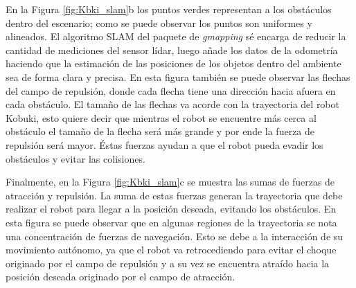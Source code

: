 En la Figura \ref{fig:Kbki_slam}b los puntos verdes representan a los obstáculos dentro
del escenario; como se puede observar los puntos son uniformes y alineados. El algoritmo
SLAM del paquete de \textit{gmapping} sé encarga de reducir la cantidad de mediciones del
sensor lídar, luego añade los datos de la odometría haciendo que la estimación de las 
posiciones de los objetos dentro del ambiente sea de forma clara y precisa. En esta figura
también se puede observar las flechas del campo de repulsión, donde cada flecha tiene una
dirección hacia afuera en cada obstáculo. El tamaño de las flechas va acorde con la 
trayectoria del robot Kobuki, esto quiere decir que mientras el robot se encuentre más
cerca al obstáculo el tamaño de la flecha será más grande y por ende la fuerza de 
repulsión será mayor. Éstas fuerzas ayudan a que el robot pueda evadir los obstáculos
y evitar las colisiones. 

Finalmente, en la Figura \ref{fig:Kbki_slam}c se muestra las sumas de fuerzas de atracción y
repulsión. La suma de estas fuerzas generan la trayectoria que debe realizar el robot
para llegar a la posición deseada, evitando los obstáculos. En esta figura se puede observar
que en algunas regiones de la trayectoria se nota una concentración de fuerzas de 
navegación. Esto se debe a la interacción de su movimiento autónomo, ya que el robot va 
retrocediendo para evitar el choque originado por el campo de repulsión y a su vez se 
encuentra atraído hacia la posición deseada originado por el campo de atracción.


